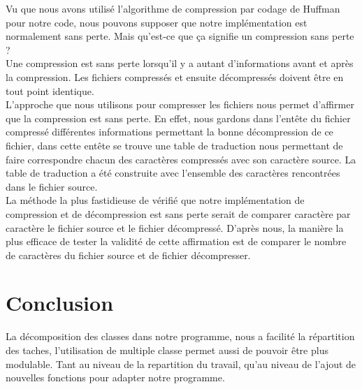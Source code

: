 \documentclass[10pt,a4paper]{article}
\begin{document}
Vu que nous avons utilisé l'algorithme de compression par codage de Huffman pour notre code, nous pouvons supposer que notre implémentation est normalement sans perte. Mais qu'est-ce que ça signifie un compression sans perte ? \\ Une compression est sans perte lorsqu'il y a autant d'informations avant et après la compression. Les fichiers compressés et ensuite décompressés doivent être en tout point identique.\\
L'approche que nous utilisons pour compresser les fichiers nous permet d'affirmer que la compression est sans perte. En effet, nous gardons dans l'entête du fichier compressé différentes informations permettant la bonne décompression de ce fichier, dans cette entête se trouve une table de traduction nous permettant de faire correspondre chacun des caractères compressés avec son caractère source. La table de traduction a été construite avec l'ensemble des caractères rencontrées dans le fichier source. \\La méthode la plus fastidieuse de vérifié que notre implémentation de compression et de décompression est sans perte serait de comparer caractère par caractère le fichier source et le fichier décompressé. D'après nous, la manière la plus efficace de tester la validité de cette affirmation est de comparer le nombre de caractères du fichier source et de fichier décompresser.

\section*{Conclusion}
La décomposition des classes dans notre programme, nous a facilité la répartition des taches, l'utilisation de multiple classe permet aussi de pouvoir être plus modulable. Tant au niveau de la repartition du travail, qu'au niveau de l'ajout de nouvelles fonctions pour adapter notre programme.\\ 
\end{document}
